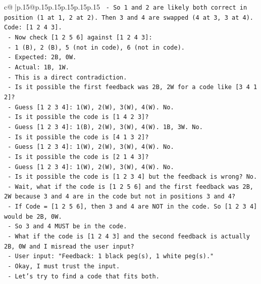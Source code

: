 \documentclass{article}
\begin{document}
{\begin{supertabular}{c@{$\;$}|p{.15\linewidth}@{}p{.15\linewidth}p{.15\linewidth}p{.15\linewidth}p{.15\linewidth}p{.15\linewidth}}
{{{\texttt{          {-} So 1 and 2 are likely both correct in position (1 at 1, 2 at 2). Then 3 and 4 are swapped (4 at 3, 3 at 4). Code: {[}1 2 4 3{]}.} \\
\texttt{        {-} Now check {[}1 2 5 6{]} against {[}1 2 4 3{]}:} \\
\texttt{          {-} 1 (B), 2 (B), 5 (not in code), 6 (not in code).} \\
\texttt{          {-} Expected: 2B, 0W.} \\
\texttt{          {-} Actual: 1B, 1W.} \\
\texttt{        {-} This is a direct contradiction.} \\
\texttt{        {-} Is it possible the first feedback was 2B, 2W for a code like {[}3 4 1 2{]}?} \\
\texttt{          {-} Guess {[}1 2 3 4{]}: 1(W), 2(W), 3(W), 4(W). No.} \\
\texttt{        {-} Is it possible the code is {[}1 4 2 3{]}?} \\
\texttt{          {-} Guess {[}1 2 3 4{]}: 1(B), 2(W), 3(W), 4(W). 1B, 3W. No.} \\
\texttt{        {-} Is it possible the code is {[}4 1 3 2{]}?} \\
\texttt{          {-} Guess {[}1 2 3 4{]}: 1(W), 2(W), 3(W), 4(W). No.} \\
\texttt{        {-} Is it possible the code is {[}2 1 4 3{]}?} \\
\texttt{          {-} Guess {[}1 2 3 4{]}: 1(W), 2(W), 3(W), 4(W). No.} \\
\texttt{        {-} Is it possible the code is {[}1 2 3 4{]} but the feedback is wrong? No.} \\
\texttt{        {-} Wait, what if the code is {[}1 2 5 6{]} and the first feedback was 2B, 2W because 3 and 4 are in the code but not in positions 3 and 4?} \\
\texttt{          {-} If Code = {[}1 2 5 6{]}, then 3 and 4 are NOT in the code. So {[}1 2 3 4{]} would be 2B, 0W.} \\
\texttt{          {-} So 3 and 4 MUST be in the code.} \\
\texttt{        {-} What if the code is {[}1 2 4 3{]} and the second feedback is actually 2B, 0W and I misread the user input?} \\
\texttt{          {-} User input: "Feedback: 1 black peg(s), 1 white peg(s)."} \\
\texttt{          {-} Okay, I must trust the input.} \\
\texttt{        {-} Let's try to find a code that fits both.} \\
}}}
\end{supertabular}}
\end{document}
